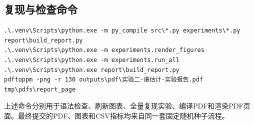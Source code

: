 \documentclass[UTF8,zihao=-4,fontset=windows]{ctexart}
\begin{document}
\subsection{复现与检查命令}
\begin{lstlisting}
.\.venv\Scripts\python.exe -m py_compile src\*.py experiments\*.py report\build_report.py
.\.venv\Scripts\python.exe -m experiments.render_figures
.\.venv\Scripts\python.exe -m experiments.run_all
.\.venv\Scripts\python.exe report\build_report.py
pdftoppm -png -r 130 outputs\pdf\实验二-谱估计-实验报告.pdf tmp\pdfs\report_page
\end{lstlisting}

上述命令分别用于语法检查、刷新图表、全量复现实验、编译PDF和渲染PDF页面。最终提交的PDF、图表和CSV指标均来自同一套固定随机种子流程。
\end{document}
